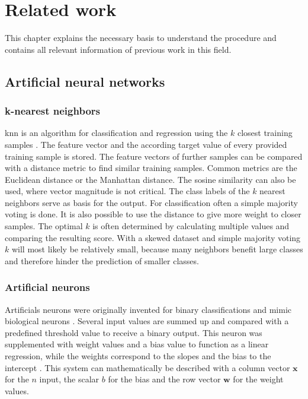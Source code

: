 \chapter{Related work}
This chapter explains the necessary basis to understand the procedure and contains all relevant information of previous work in this field.
\section{Artificial neural networks}

\subsection{k-nearest neighbors}
\gls{knn} is an algorithm for classification and regression using the $k$ closest training samples \autocite{fix1989,cover1967}. The feature vector and the according target value of every provided training sample is stored. The feature vectors of further samples can be compared with a distance metric to find similar training samples. Common metrics are the Euclidean distance or the Manhattan distance. The sosine similarity can also be used, where vector magnitude is not critical. 
The class labels of the $k$ nearest neighbors serve as basis for the output. For classification often a simple majority voting is done. It is also possible to use the distance to give more weight to closer samples.
The optimal $k$ is often determined by calculating multiple values and comparing the resulting score. With a skewed dataset and simple majority voting $k$ will most likely be relatively small, because many neighbors benefit large classes and therefore hinder the prediction of smaller classes.


\subsection{Artificial neurons}
Artificials neurons were originally invented for binary classifications and mimic biological neurons \autocite{mcculloch1943}. Several input values are summed up and compared with a predefined threshold value to receive a binary output. This neuron was supplemented with weight values and a bias value to function as a linear regression, while the weights correspond to the slopes and the bias to the intercept  \autocite{rosenblatt1957}. This system can mathematically be described with a column vector $\mathbf{x}$ for the $n$ input, the scalar $b$ for the bias and the row vector $\mathbf{w}$ for the weight values.

